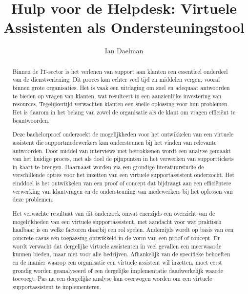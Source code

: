 \documentclass{hogent-article}
\title{Hulp voor de Helpdesk: Virtuele Assistenten als Ondersteuningstool}
\author{Ian Daelman}
\begin{document}
\begin{abstract}
  
  Binnen de IT-sector is het verlenen van support aan klanten een essentieel onderdeel van de dienstverlening. Dit proces kan echter veel tijd en middelen vergen, vooral binnen grote organisaties. Het is vaak een uitdaging om snel en adequaat antwoorden te bieden op vragen van klanten, wat resulteert in een aanzienlijke investering van resources. Tegelijkertijd verwachten klanten een snelle oplossing voor hun problemen. Het is daarom in het belang van zowel de organisatie als de klant om vragen efficiënt te beantwoorden.
  
  Deze bachelorproef onderzoekt de mogelijkheden voor het ontwikkelen van een virtuele assistent die supportmedewerkers kan ondersteunen bij het vinden van relevante antwoorden. Door middel van interviews met betrokkenen wordt een analyse gemaakt van het huidige proces, met als doel de pijnpunten in het verwerken van supporttickets in kaart te brengen. Daarnaast worden via een grondige literatuurstudie de verschillende opties voor het inzetten van een virtuele supportassistent onderzocht. Het einddoel is het ontwikkelen van een proof of concept dat bijdraagt aan een efficiëntere verwerking van klantvragen en de ondersteuning van medewerkers bij het oplossen van deze problemen.
  
  Het verwachte resultaat van dit onderzoek omvat enerzijds een overzicht van de mogelijkheden van een virtuele supportassistent, met aandacht voor wat praktisch haalbaar is en welke factoren daarbij een rol spelen. Anderzijds wordt op basis van een concrete casus een toepassing ontwikkeld in de vorm van een proof of concept. Er wordt verwacht dat dergelijke virtuele assistenten in veel gevallen een meerwaarde kunnen bieden, maar niet voor alle bedrijven. Afhankelijk van de specifieke behoeften en de manier waarop een organisatie een virtuele assistent wil inzetten, moet eerst grondig worden geanalyseerd of een dergelijke implementatie daadwerkelijk waarde toevoegt. Pas na een dergelijke analyse kan overwogen worden om een virtuele supportassistent te implementeren.
  
 
\end{abstract}

\tableofcontents



\printbibliography[heading=bibintoc]
\end{document}
